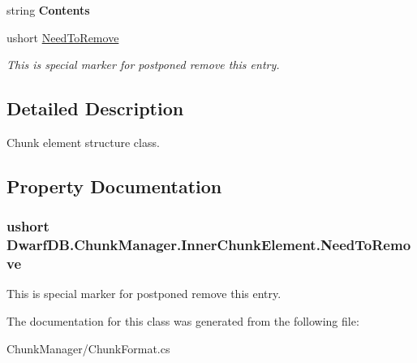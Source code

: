 \begin{DoxyCompactItemize}
\item 
\hypertarget{class_dwarf_d_b_1_1_chunk_manager_1_1_inner_chunk_element_aaa858cacd03db797d6645ee66da28e1b}{
string {\bfseries Contents}}
\label{class_dwarf_d_b_1_1_chunk_manager_1_1_inner_chunk_element_aaa858cacd03db797d6645ee66da28e1b}

\item 
ushort \hyperlink{class_dwarf_d_b_1_1_chunk_manager_1_1_inner_chunk_element_a7b13a3cd14e1d08e8c5bd18c1d0c60e5}{NeedToRemove}
\begin{DoxyCompactList}\small\item\em This is special marker for postponed remove this entry. \item\end{DoxyCompactList}\end{DoxyCompactItemize}


\subsection{Detailed Description}
Chunk element structure class. 

\subsection{Property Documentation}
\hypertarget{class_dwarf_d_b_1_1_chunk_manager_1_1_inner_chunk_element_a7b13a3cd14e1d08e8c5bd18c1d0c60e5}{
\subsubsection[{NeedToRemove}]{\setlength{\rightskip}{0pt plus 5cm}ushort DwarfDB.ChunkManager.InnerChunkElement.NeedToRemove}}
\label{class_dwarf_d_b_1_1_chunk_manager_1_1_inner_chunk_element_a7b13a3cd14e1d08e8c5bd18c1d0c60e5}


This is special marker for postponed remove this entry. 



The documentation for this class was generated from the following file:\begin{DoxyCompactItemize}
\item 
ChunkManager/ChunkFormat.cs\end{DoxyCompactItemize}
